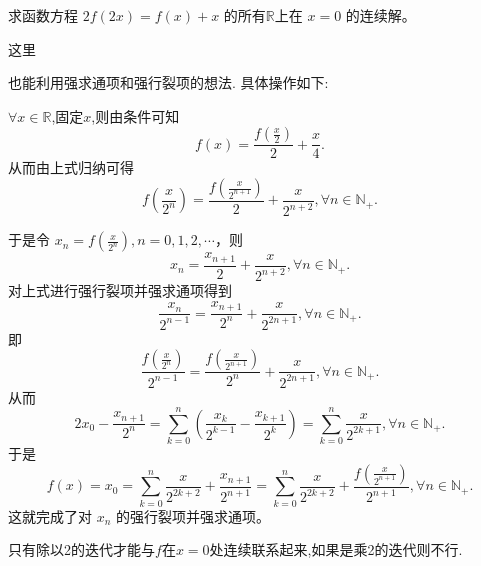 \documentclass[lang=cn,newtx,10pt,scheme=chinese]{elegantbook}
\begin{document}
\begin{example}
求函数方程 \(2f(2x)=f(x)+x\) 的所有\(\mathbb{R}\)上在 \(x = 0\) 的连续解。
\end{example}
\begin{note}
\hypertarget{注意到的原因见笔记部分123}{这里}也能利用强求通项和强行裂项的想法. 具体操作如下:

$\forall x\in \mathbb{R}$,固定$x$,则由条件可知
\[
f(x)=\frac{f\left(\frac{x}{2}\right)}{2}+\frac{x}{4}.
\]
从而由上式归纳可得
\[
f\left(\frac{x}{2^n}\right)=\frac{f\left(\frac{x}{2^{n + 1}}\right)}{2}+\frac{x}{2^{n + 2}},\forall n\in \mathbb{N}_+.
\]

于是令 \(x_n = f\left(\frac{x}{2^n}\right),n = 0,1,2,\cdots\)，则
\[
x_n=\frac{x_{n + 1}}{2}+\frac{x}{2^{n + 2}},\forall n\in \mathbb{N}_+.
\]
对上式进行强行裂项并强求通项得到
\[
\frac{x_n}{2^{n - 1}}=\frac{x_{n + 1}}{2^n}+\frac{x}{2^{2n + 1}},\forall n\in \mathbb{N}_+.
\]
即
\[
\frac{f\left(\frac{x}{2^n}\right)}{2^{n - 1}}=\frac{f\left(\frac{x}{2^{n + 1}}\right)}{2^n}+\frac{x}{2^{2n + 1}},\forall n\in \mathbb{N}_+.
\]
从而
\[
2x_0-\frac{x_{n + 1}}{2^n}=\sum_{k = 0}^n\left(\frac{x_k}{2^{k - 1}}-\frac{x_{k + 1}}{2^k}\right)=\sum_{k = 0}^n\frac{x}{2^{2k + 1}},\forall n\in \mathbb{N}_+.
\]
于是
\[
f(x)=x_0=\sum_{k = 0}^n\frac{x}{2^{2k + 2}}+\frac{x_{n + 1}}{2^{n + 1}}=\sum_{k = 0}^n\frac{x}{2^{2k + 2}}+\frac{f\left(\frac{x}{2^{n + 1}}\right)}{2^{n + 1}},\forall n\in \mathbb{N}_+.
\]
这就完成了对 \(x_n\) 的强行裂项并强求通项。
\end{note}
\begin{remark}
只有除以2的迭代才能与$f$在$x=0$处连续联系起来,如果是乘2的迭代则不行.
\end{remark}
\end{document}
